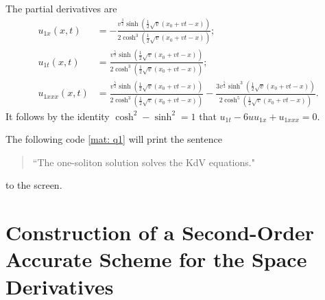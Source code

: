 \documentclass{assignment}[2019/10/15]
\begin{document}
    The partial derivatives are
    \begin{equation}
        \begin{aligned}
            u_{1x}(x,t)&=-\frac{v^{\frac{3}{2}}\sinh(\frac{1}{2}\sqrt{v}(x_0+vt-x))}{2\cosh^{3}(\frac{1}{2}\sqrt{v}(x_0+vt-x))};\\
            u_{1t}(x,t)&=\frac{v^{\frac{5}{2}}\sinh(\frac{1}{2}\sqrt{v}(x_0+vt-x))}{2\cosh^{3}(\frac{1}{2}\sqrt{v}(x_0+vt-x))};\\
            u_{1xxx}(x,t)&=\frac{v^{\frac{5}{2}}\sinh(\frac{1}{2}\sqrt{v}(x_0+vt-x))}{2\cosh^{3}(\frac{1}{2}\sqrt{v}(x_0+vt-x))}-\frac{3v^{\frac{5}{2}}\sinh^{3}(\frac{1}{2}\sqrt{v}(x_0+vt-x))}{2\cosh^{5}(\frac{1}{2}\sqrt{v}(x_0+vt-x))}.
        \end{aligned}
    \end{equation}
    It follows by the identity $\cosh^2 - \sinh^2 = 1$ that $u_{1t} - 6 uu_{1x} + u_{1xxx}=0$.

    The following code \ref{mat: q1} will print the sentence
    \begin{quote}
        ``The one-soliton solution solves the KdV equations."
    \end{quote}
    to the screen.


    \section{Construction of a Second-Order Accurate Scheme for the Space Derivatives}
\end{document}
